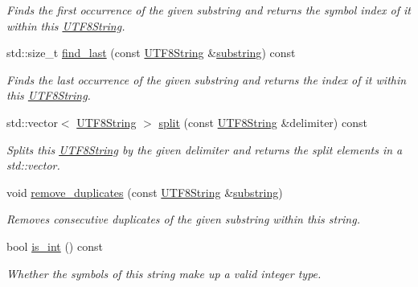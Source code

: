 \begin{DoxyCompactItemize}
\begin{DoxyCompactList}\small\item\em Finds the first occurrence of the given substring and returns the symbol index of it within this \hyperlink{classchaos_1_1uni_1_1_u_t_f8_string}{U\-T\-F8\-String}. \end{DoxyCompactList}\item 
std\-::size\-\_\-t \hyperlink{classchaos_1_1uni_1_1_u_t_f8_string_a482f2501d37379eab6661c45f13b0126}{find\-\_\-last} (const \hyperlink{classchaos_1_1uni_1_1_u_t_f8_string}{U\-T\-F8\-String} \&\hyperlink{classchaos_1_1uni_1_1_u_t_f8_string_a6a92e0b096b7d0087e3c784fa7f891aa}{substring}) const 
\begin{DoxyCompactList}\small\item\em Finds the last occurrence of the given substring and returns the index of it within this \hyperlink{classchaos_1_1uni_1_1_u_t_f8_string}{U\-T\-F8\-String}. \end{DoxyCompactList}\item 
std\-::vector$<$ \hyperlink{classchaos_1_1uni_1_1_u_t_f8_string}{U\-T\-F8\-String} $>$ \hyperlink{classchaos_1_1uni_1_1_u_t_f8_string_afcdc19149409834d2e28f46c597f4a15}{split} (const \hyperlink{classchaos_1_1uni_1_1_u_t_f8_string}{U\-T\-F8\-String} \&delimiter) const 
\begin{DoxyCompactList}\small\item\em Splits this \hyperlink{classchaos_1_1uni_1_1_u_t_f8_string}{U\-T\-F8\-String} by the given delimiter and returns the split elements in a std\-::vector. \end{DoxyCompactList}\item 
void \hyperlink{classchaos_1_1uni_1_1_u_t_f8_string_a940e7ccc70fe1d6c486a5a89941dd2ef}{remove\-\_\-duplicates} (const \hyperlink{classchaos_1_1uni_1_1_u_t_f8_string}{U\-T\-F8\-String} \&\hyperlink{classchaos_1_1uni_1_1_u_t_f8_string_a6a92e0b096b7d0087e3c784fa7f891aa}{substring})
\begin{DoxyCompactList}\small\item\em Removes consecutive duplicates of the given substring within this string. \end{DoxyCompactList}\item 
bool \hyperlink{classchaos_1_1uni_1_1_u_t_f8_string_a758102d22056ad004660c49104526642}{is\-\_\-int} () const 
\begin{DoxyCompactList}\small\item\em Whether the symbols of this string make up a valid integer type. \end{DoxyCompactList}\item 

\end{DoxyCompactItemize}
